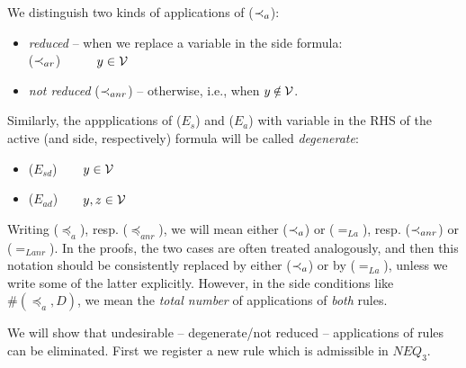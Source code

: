 \begin{DEFINITION}
\begin{itemize}
\end{itemize}
We distinguish two kinds of applications of ($\mathbin{\prec}_a$):
\begin{itemize}\MyLPar
\item  {\em reduced} -- when we replace a variable in the side formula:\\
 ($\mathbin{\prec}_{ar}$)\ \ 
\label{ru:ar}\ \ \  $y\in {\cal V}$
\item {\em not reduced} ($\mathbin{\prec}_{anr}$) -- otherwise, i.e.,  when
$y\not\in\Vars$. 
\end{itemize}
Similarly, the appplications of ($E_s$) and ($E_a$) with variable in the RHS
of the active (and side, respectively) formula will be
called {\em degenerate}:
\begin{itemize}\MyLPar
\item ($E_{sd}$)\ \ \ \
 $y\in{\cal V}$
\item ($E_{ad}$)\ \ \prule{\Gamma,x\Incl z, y\Incl x,\Seq\Delta}{\Gamma,
y\Incl z,\Seq\Delta}\ \
 $y, z\in{\cal V}$
\end{itemize}
\end{DEFINITION}
\begin{REMARK}\label{re:notation}
Writing ($\preceq_a$), resp. ($\preceq_{anr}$), we will mean 
either ($\mathbin{\prec}_a$) or ($=_{La}$), resp. ($\mathbin{\prec}_{anr}$) or ($=_{Lanr}$).
In the proofs, the
 two cases are often treated analogously, and then this notation should be
 consistently replaced by either ($\mathbin{\prec}_a$) or by ($=_{La}$), unless we
 write some of the latter explicitly. 
However, in the side conditions like $\#(\preceq_a,D)$, we mean the {\em total number}
of applications of {\em both} rules.
\end{REMARK}
\noindent
We will show that undesirable -- degenerate/not reduced -- applications of rules
can be eliminated.
First we register a new rule which is admissible in $NEQ_3$.
